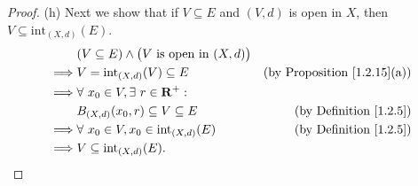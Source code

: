 \begin{proof}{(h)}
    Next we show that if \(V \subseteq E\) and \((V, d)\) is open in \(X\), then \(V \subseteq \text{int}_{(X, d)}(E)\).
    \begin{align*}
                 & (V \subseteq E) \land \big(V \text{ is open in } (X, d)\big)                                           \\
        \implies & V = \text{int}_{(X, d)}(V) \subseteq E                       & \text{(by Proposition \ref{1.2.15}(a))} \\
        \implies & \forall\ x_0 \in V, \exists\ r \in \mathbf{R}^+ :                                                      \\
                 & B_{(X, d)}(x_0, r) \subseteq V \subseteq E                   & \text{(by Definition \ref{1.2.5})}      \\
        \implies & \forall\ x_0 \in V, x_0 \in \text{int}_{(X, d)}(E)           & \text{(by Definition \ref{1.2.5})}      \\
        \implies & V \subseteq \text{int}_{(X, d)}(E).
    \end{align*}


\end{proof}
